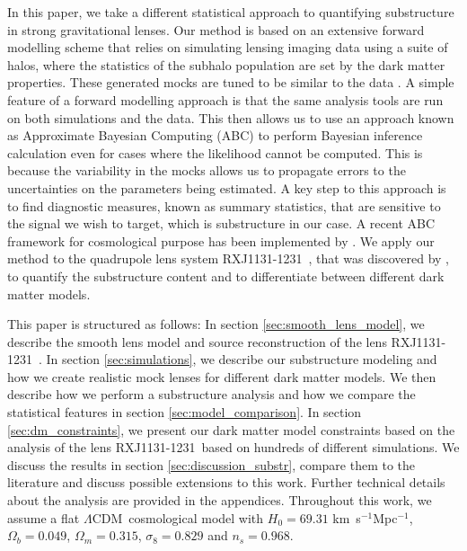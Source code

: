 \documentclass[a4paper,11pt]{article}
\def \RXJ {RXJ1131-1231~}
\def \LCDM {\ensuremath{\Lambda\text{CDM}}~}
\begin{document}
In this paper, we take a different statistical approach to quantifying substructure in strong gravitational lenses. Our method is based on an extensive forward modelling scheme that relies on simulating lensing imaging data using a suite of halos, where the statistics of the subhalo population are set by the dark matter properties.
These generated mocks are tuned to be similar to the data \citep[see e.g.][for other application of forward modelling in cosmology]{Kacprzak:2012p14788, Mesinger:2011p14795, Reinecke:2006p14798, Peterson:2015p14808, Juin:2007p14830, Pires:2009p14840, Dietrich:2010p14848, Marian:2012p14852, Heymans:2006p14883, Massey:2007p14886, Bridle:2009p14888, Refregier:2014p14915, Bruderer:2016p14919}. 
A simple feature of a forward modelling approach is that the same analysis tools are run on both simulations and the data. This then allows us to use an approach known as Approximate Bayesian Computing (ABC) \cite{Rubin:1984p15259, Diggle:1984p15276, Tavare:1997p15227, Turner:2012p14944, Liepe:2014p14925} to perform Bayesian inference calculation even for cases where the likelihood cannot be computed. This is because the variability in the mocks allows us to propagate errors to the uncertainties on the parameters being estimated. A key step to this approach is to find diagnostic measures, known as summary statistics, that are sensitive to the signal we wish to target, which is substructure in our case. A recent ABC framework for cosmological purpose has been implemented by \cite{Akeret:2015p15286}.
We apply our method to the quadrupole lens system \RXJ, that was discovered by \cite{Sluse:2003p8680}, to quantify the substructure content and to differentiate between different dark matter models.

This paper is structured as follows: In section \ref{sec:smooth_lens_model}, we describe the smooth lens model and source reconstruction of the lens \RXJ. In section \ref{sec:simulations}, we describe our substructure modeling and how we create realistic mock lenses for different dark matter models. We then describe how we perform a substructure analysis and how we compare the statistical features in section \ref{sec:model_comparison}. In section \ref{sec:dm_constraints}, we present our dark matter model constraints based on the analysis of the lens \RXJ based on hundreds of different simulations. We discuss the results in section \ref{sec:discussion_substr}, compare them to the literature and discuss possible extensions to this work. Further technical details about the analysis are provided in the appendices.
Throughout this work, we assume a flat \LCDM cosmological model with $H_0 = 69.31$ km~s$^{-1}$Mpc$^{-1}$, $\Omega_b = 0.049$, $\Omega_m=0.315$, $\sigma_{8}=0.829$ and $n_s = 0.968$.
\end{document}
